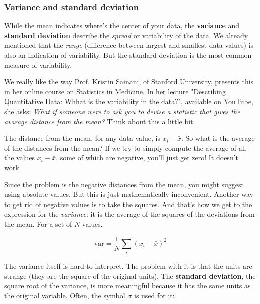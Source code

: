 \documentclass[11pt]{article}
\begin{document}
    \subsubsection{Variance and standard
deviation}\label{variance-and-standard-deviation}

While the mean indicates where's the center of your data, the
\textbf{variance} and \textbf{standard deviation} describe the
\emph{spread} or variability of the data. We already mentioned that the
\emph{range} (difference between largest and smallest data values) is
also an indication of variability. But the standard deviation is the
most common measure of variability.

We really like the way
\href{https://profiles.stanford.edu/kristin-sainani}{Prof. Kristin
Sainani}, of Stanford University, presents this in her online course on
\href{https://lagunita.stanford.edu/courses/Medicine/MedStats-SP/SelfPaced/about}{Statistics
in Medicine}. In her lecture "Describing Quantitative Data: Whhat is the
variability in the data?", available
\href{https://youtu.be/hlFeEQF5tDc}{on YouTube}, she asks: \emph{What if
someone were to ask you to devise a statistic that gives the avarage
distance from the mean?} Think about this a little bit.

The distance from the mean, for any data value, is \(x_i - \bar{x}\). So
what is the average of the distances from the mean? If we try to simply
compute the average of all the values \(x_i - \bar{x}\), some of which
are negative, you'll just get zero! It doesn't work.

Since the problem is the negative distances from the mean, you might
suggest using absolute values. But this is just mathematically
inconvenient. Another way to get rid of negative values is to take the
squares. And that's how we get to the expression for the
\emph{variance}: it is the average of the squares of the deviations from
the mean. For a set of \(N\) values,

\begin{equation*}
     \text{var} = \frac{1}{N}\sum_{i} (x_i - \bar{x})^2
\end{equation*}

The variance itself is hard to interpret. The problem with it is that
the units are strange (they are the square of the original units). The
\textbf{standard deviation}, the square root of the variance, is more
meaningful because it has the same units as the original variable.
Often, the symbol \(\sigma\) is used for it:
\end{document}
